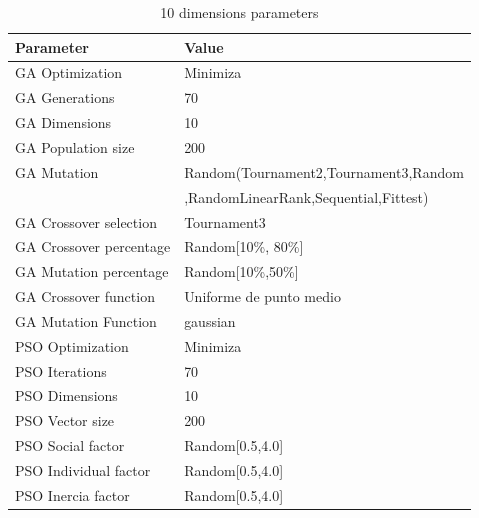 \documentclass[runningheads]{llncs}
\begin{document}
    \begin{table}[htp]
      \caption{10 dimensions parameters}
      \label{table:ga-pso-parameters-10}
      \centering
      \begin{tabular}{|l|l|}
      \hline
      Parameter & Value \\
      \hline
      \hline
      GA Optimization & Minimiza \\
      \hline
GA Generations & 70 \\
      \hline
GA Dimensions & 10 \\
      \hline
GA Population size & 200 \\
      \hline
GA Mutation & Random(Tournament2,Tournament3,Random \\
      &  ,RandomLinearRank,Sequential,Fittest)\\
      \hline
GA Crossover selection& Tournament3\\
      \hline
GA Crossover percentage & Random[10\%, 80\%] \\
      \hline
GA Mutation percentage & Random[10\%,50\%] \\
      \hline
GA Crossover function & Uniforme de punto medio \\
      \hline
GA Mutation Function & gaussian \\
      \hline
PSO Optimization & Minimiza \\
      \hline
PSO Iterations & 70 \\
      \hline
PSO Dimensions & 10 \\
      \hline
PSO Vector size & 200 \\
      \hline
PSO Social factor & Random[0.5,4.0] \\
      \hline
PSO Individual factor & Random[0.5,4.0] \\
      \hline
PSO Inercia factor & Random[0.5,4.0] \\
      \hline
      \end{tabular}
      \end{table}
    

\end{document}
